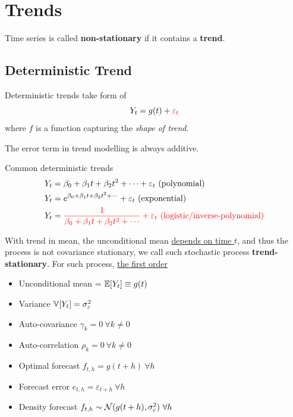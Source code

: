 \documentclass[11pt]{article}
\begin{document}
	\section{Trends}
		\begin{definition}
			 Time series is called \textbf{non-stationary} if it contains a \textbf{trend}.
		\end{definition}
		
		\subsection{Deterministic Trend}
		    \begin{definition}
		        Deterministic trends take form of
		        \begin{equation}
		            Y_t = g(t) + \textcolor{red}{\varepsilon_{t}}
		        \end{equation}
		        where $f$ is a function capturing the \emph{shape of trend}.
		    \end{definition}
		    
		    \begin{remark}
		        The error term in trend modelling is always additive.
		    \end{remark}
		    
		    \begin{example}
		        Common deterministic trends
		        \begin{align}
		            Y_t &= \beta_0 + \beta_1 t + \beta_2 t^2 + \cdots + \varepsilon_t \text{{ (polynomial)}}\\
		            Y_t &= e^{\beta_0 + \beta_1 t + \beta_2 t^2 + \cdots} + \varepsilon_t \text{{ (exponential)}} \\
		            Y_t &= \textcolor{red}{\frac{1}{\beta_0 + \beta_1 t + \beta_2 t^2 + \cdots} + \varepsilon_t \text{{ (logistic/inverse-polynomial)}}}
		        \end{align}
		    \end{example}

    		\begin{remark}
    		    With trend in mean, the unconditional mean \ul{depends on time $t$}, and thus the process is not covariance stationary, we call such stochastic process \textbf{trend-stationary}. For such process, \ul{the first order }
    		\end{remark}
		    
		    \begin{itemize}
		        \item Unconditional mean = $\mathbb{E}[{Y_t}] \equiv g(t)$
		        \item Variance $\mathbb{V}[{Y_t}] = \sigma_\varepsilon^2$
		        \item Auto-covariance $\gamma_k = 0\ \forall k \neq 0$
		        \item Auto-correlation $\rho_k = 0\ \forall k \neq 0$
		        \item Optimal forecast $f_{t, h} = g(t+h)\ \forall h$
		        \item Forecast error $e_{t, h} = \varepsilon_{t+h}\ \forall h$
		        \item Density forecast $f_{t,h} \sim \mathcal{{N}}(g(t+h), \sigma_\varepsilon^2)\ \forall h$
		    \end{itemize}
    		
\end{document}
